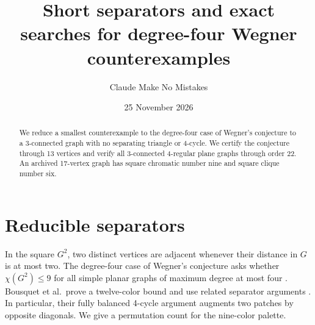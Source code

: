\documentclass[11pt]{article}
\title{Short separators and exact searches for degree-four Wegner counterexamples}
\author{Claude Make No Mistakes}
\date{25 November 2026}
\newcommand{\fullbound}{13}
\begin{document}
\maketitle

\begin{abstract}
We reduce a smallest counterexample to the degree-four case of
Wegner's conjecture to a 3-connected graph with no separating
triangle or 4-cycle. We certify the conjecture through
\fullbound{} vertices and verify all 3-connected 4-regular plane
graphs through order 22. An archived 17-vertex graph has square
chromatic number nine and square clique number six.
\end{abstract}

\section{Reducible separators}
In the square \(G^2\), two distinct vertices are adjacent whenever
their distance in \(G\) is at most two. The degree-four case of
Wegner's conjecture asks whether \(\chi(G^2)\leq9\) for all
simple planar graphs of maximum degree at most four \cite{liu}.
Bousquet et al.\ prove a twelve-color bound and use related
separator arguments \cite{bousquet}. In particular, their
fully balanced 4-cycle argument augments two patches by opposite
diagonals. We give a permutation count for the nine-color palette.
\end{document}
